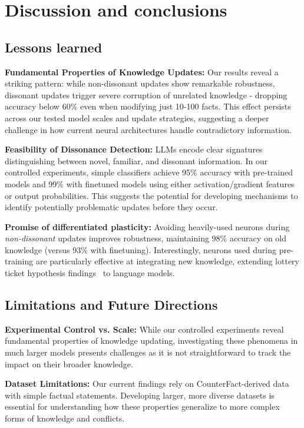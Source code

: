 \section{Discussion and conclusions }\label{sec:lessons}
\subsection{Lessons learned}
\noindent \textbf{Fundamental Properties of Knowledge Updates:} 
Our results reveal a striking pattern: while non-dissonant updates show remarkable robustness, dissonant updates trigger severe corruption of unrelated knowledge - dropping accuracy below 60\% even when modifying just 10-100 facts. This effect persists across our tested model scales and update strategies, suggesting a deeper challenge in how current neural architectures handle contradictory information.

\noindent \textbf{Feasibility of Dissonance Detection:} 
LLMs encode clear signatures distinguishing between novel, familiar, and dissonant information. In our controlled experiments, simple classifiers achieve 95\% accuracy with pre-trained models and 99\% with finetuned models using either activation/gradient features or output probabilities. This suggests the potential for developing mechanisms to identify potentially problematic updates before they occur.

\noindent \textbf{Promise of differentiated plasticity:} 
Avoiding heavily-used neurons during \emph{non-dissonant} updates  improves robustness, maintaining 98\% accuracy on old knowledge (versus 93\% with finetuning). Interestingly, neurons used during pre-training are particularly effective at integrating new knowledge, extending lottery ticket hypothesis findings~\citep{frankle2018lottery} to language models.

\subsection{Limitations and Future Directions}
\noindent \textbf{Experimental Control vs. Scale:} 
While our controlled experiments reveal fundamental properties of knowledge updating, investigating these phenomena in much larger models presents challenges as it is not straightforward to track the impact on their broader knowledge.

\noindent \textbf{Dataset Limitations:} 
Our current findings rely on CounterFact-derived data with simple factual statements. Developing larger, more diverse datasets is essential for understanding how these properties generalize to more complex forms of knowledge and conflicts.

